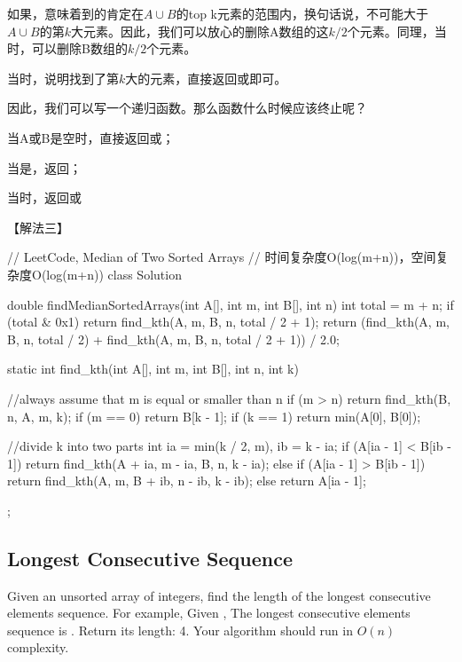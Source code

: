 如果，意味着到\fn{A[k/2-1}的肯定在$A \cup B$的top
k元素的范围内，换句话说，\fn{A[k/2-1}不可能大于$A \cup B$的第$k$大元素。因此，我们可以放心的删除A数组的这$k/2$个元素。同理，当时，可以删除B数组的$k/2$个元素。

当时，说明找到了第$k$大的元素，直接返回或即可。

因此，我们可以写一个递归函数。那么函数什么时候应该终止呢？
\begindot
\item 当A或B是空时，直接返回或；
\item 当是，返回；
\item 当时，返回或
\myenddot

【解法三】
\begin{Code}
	// LeetCode, Median of Two Sorted Arrays
	// 时间复杂度O(log(m+n))，空间复杂度O(log(m+n))
	class Solution {
		double findMedianSortedArrays(int A[], int m, int B[], int n) {
			int total = m + n;
			if (total & 0x1)
				return find_kth(A, m, B, n, total / 2 + 1);
			return (find_kth(A, m, B, n, total / 2) + find_kth(A, m, B, n, total / 2 + 1)) / 2.0;
		}
		
		static int find_kth(int A[], int m, int B[], int n, int k) {
			//always assume that m is equal or smaller than n
			if (m > n) return find_kth(B, n, A, m, k);
			if (m == 0) return B[k - 1];
			if (k == 1) return min(A[0], B[0]);
			
			//divide k into two parts
			int ia = min(k / 2, m), ib = k - ia;
			if (A[ia - 1] < B[ib - 1])
				return find_kth(A + ia, m - ia, B, n, k - ia);
			else if (A[ia - 1] > B[ib - 1])
				return find_kth(A, m, B + ib, n - ib, k - ib);
			else
				return A[ia - 1];
		}
	};
\end{Code}


\subsection{Longest Consecutive Sequence} %
\label{sec:longest-consecutive-sequence}



Given an unsorted array of integers, find the length of the longest consecutive
elements sequence.
For example,
Given \code{[100, 4, 200, 1, 3, 2]},
The longest consecutive elements sequence is \code{[1, 2, 3, 4]}. Return its
length: 4.
Your algorithm should run in $O(n)$ complexity.


